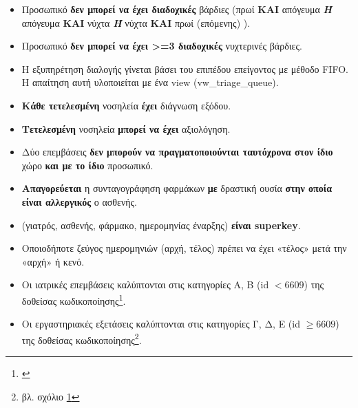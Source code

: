 \documentclass[13pt]{article}
\newcommand{\eng}[1]{\foreignlanguage{english}{#1}}
\begin{document}
\begin{itemize}
  \begin{itemize}
  \tightlist
  \item
    γιατρός: 15,
  \item
    νοσηλευτής: 20,
  \item
    διοικητικό προσωπικό: 25.
  \end{itemize}
\item
    Προσωπικό \textbf{δεν μπορεί να έχει διαδοχικές} βάρδιες (πρωί \textbf{ΚΑΙ}
  απόγευμα \textbf{\emph{Ή}} απόγευμα \textbf{ΚΑΙ} νύχτα
  \textbf{\emph{Ή}} νύχτα \textbf{ΚΑΙ} πρωί (επόμενης) ).
\item
    Προσωπικό \textbf{δεν μπορεί να έχει \textgreater=3 διαδοχικές} νυχτερινές βάρδιες.
\item
    Η εξυπηρέτηση διαλογής γίνεται βάσει του επιπέδου επείγοντος με μέθοδο \eng{FIFO}. Η απαίτηση αυτή υλοποιείται με ένα \eng{view} (\eng{vw\_triage\_queue}).
\item 
    \textbf{Κάθε τετελεσμένη} νοσηλεία \textbf{έχει} διάγνωση εξόδου.
\item 
    \textbf{Τετελεσμένη} νοσηλεία \textbf{μπορεί να έχει} αξιολόγηση.
\item
    Δύο επεμβάσεις \textbf{δεν μπορούν να πραγματοποιούνται ταυτόχρονα στον ίδιο} χώρο \textbf{και με το ίδιο} προσωπικό.
\item
    \textbf{Απαγορεύεται} η συνταγογράφηση φαρμάκων \textbf{με} δραστική ουσία \textbf{στην οποία είναι αλλεργικός} ο ασθενής.
\item
  (γιατρός, ασθενής, φάρμακο, ημερομηνίας έναρξης) \textbf{είναι
  \eng{superkey}}.
\item 
    Οποιοδήποτε ζεύγος ημερομηνιών (αρχή, τέλος) πρέπει να έχει «τέλος» μετά την «αρχή» ή κενό.
\item
    Oι ιατρικές επεμβάσεις καλύπτονται στις κατηγορίες Α, Β (\eng{id} $< 6609$) της δοθείσας κωδικοποίησης\footnote{\label{fn:note1}\eng{\urlcodes}}.
\item
    Οι εργαστηριακές εξετάσεις καλύπτονται στις κατηγορίες Γ, Δ, Ε (\eng{id} $\geq 6609$) της δοθείσας κωδικοποίησης\footnote{βλ. σχόλιο \ref{fn:note1}}.
\end{itemize}
\end{document}
